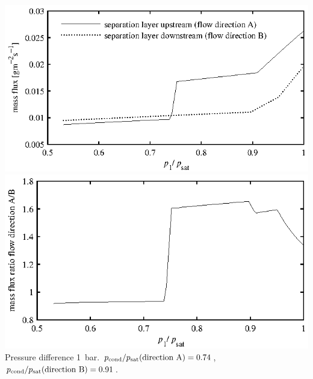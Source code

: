 \documentclass{minimal}
\begin{document}
\includegraphics{figure3.eps}
\includegraphics{figure4.eps}\\
Pressure difference 1~bar.
$p_\mathrm{cond}/p_\mathrm{sat}(\hbox{direction A}) = 0.74$,
$p_\mathrm{cond}/p_\mathrm{sat}(\hbox{direction B}) = 0.91$.\bigskip
\end{document}
